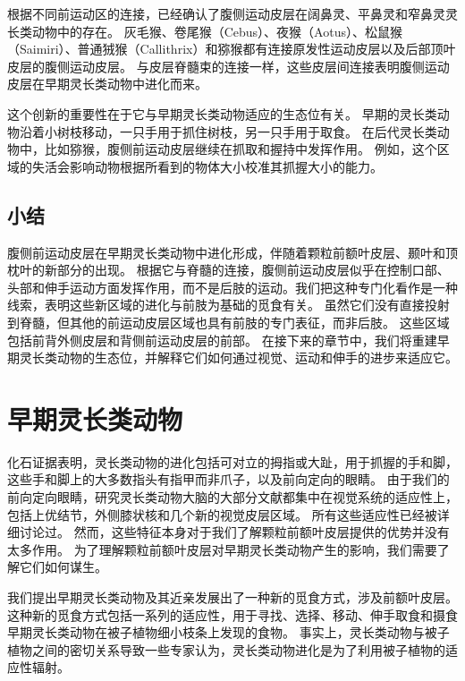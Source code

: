 根据不同前运动区的连接，已经确认了腹侧运动皮层在阔鼻灵、平鼻灵和窄鼻灵灵长类动物中的存在\cite{kaas2004evolution}。
灰毛猴、卷尾猴（Cebus）\cite{dum2004motor}、夜猴（Aotus）\cite{preuss1996movement,gharbawie2010thalamocortical}、松鼠猴（Saimiri）\cite{cowey1968varying}、普通狨猴（Callithrix）\cite{burish2008microstimulation}和猕猴\cite{lu1994interconnections}都有连接原发性运动皮层以及后部顶叶皮层的腹侧运动皮层。
与皮层脊髓束的连接一样，这些皮层间连接表明腹侧运动皮层在早期灵长类动物中进化而来。


这个创新的重要性在于它与早期灵长类动物适应的生态位有关。
早期的灵长类动物沿着小树枝移动，一只手用于抓住树枝，另一只手用于取食。
在后代灵长类动物中，比如猕猴，腹侧前运动皮层继续在抓取和握持中发挥作用。
例如，这个区域的失活会影响动物根据所看到的物体大小校准其抓握大小的能力\cite{fogassi2001cortical}。


\subsection{小结}

腹侧前运动皮层在早期灵长类动物中进化形成，伴随着颗粒前额叶皮层、颞叶和顶枕叶的新部分的出现。
根据它与脊髓的连接，腹侧前运动皮层似乎在控制口部、头部和伸手运动方面发挥作用，而不是后肢的运动。我们把这种专门化看作是一种线索，表明这些新区域的进化与前肢为基础的觅食有关。
虽然它们没有直接投射到脊髓，但其他的前运动皮层区域也具有前肢的专门表征，而非后肢。
这些区域包括前背外侧皮层和背侧前运动皮层的前部。
在接下来的章节中，我们将重建早期灵长类动物的生态位，并解释它们如何通过视觉、运动和伸手的进步来适应它。



\section{早期灵长类动物}

化石证据表明，灵长类动物的进化包括可对立的拇指或大趾，用于抓握的手和脚，这些手和脚上的大多数指头有指甲而非爪子，以及前向定向的眼睛\cite{fleagle2013primate,rose2006beginning}。
由于我们的前向定向眼睛，研究灵长类动物大脑的大部分文献都集中在视觉系统的适应性上，包括上优结节，外侧膝状核和几个新的视觉皮层区域。
所有这些适应性已经被详细讨论过\cite{barton2004binocularity,kaas2020evolution,preuss2007evolutionary}。
然而，这些特征本身对于我们了解颗粒前额叶皮层提供的优势并没有太多作用。
为了理解颗粒前额叶皮层对早期灵长类动物产生的影响，我们需要了解它们如何谋生。


我们提出早期灵长类动物及其近亲发展出了一种新的觅食方式，涉及前额叶皮层。
这种新的觅食方式包括一系列的适应性，用于寻找、选择、移动、伸手取食和摄食早期灵长类动物在被子植物细小枝条上发现的食物。
事实上，灵长类动物与被子植物之间的密切关系导致一些专家认为，灵长类动物进化是为了利用被子植物的适应性辐射。


